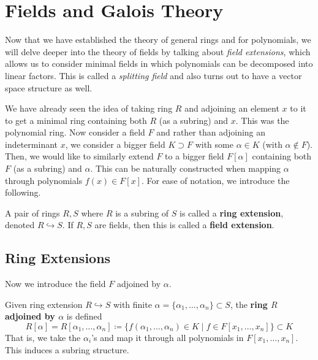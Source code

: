 \section{Fields and Galois Theory} 

  Now that we have established the theory of general rings and for polynomials, we will delve deeper into the theory of fields by talking about \textit{field extensions}, which allows us to consider minimal fields in which polynomials can be decomposed into linear factors. This is called a \textit{splitting field} and also turns out to have a vector space structure as well. 

  We have already seen the idea of taking ring $R$ and adjoining an element $x$ to it to get a minimal ring containing both $R$ (as a subring) and $x$. This was the polynomial ring. Now consider a field $F$ and rather than adjoining an indeterminant $x$, we consider a bigger field $K \supset F$ with some $\alpha \in K$ (with $\alpha \not\in F$). Then, we would like to similarly extend $F$ to a bigger field $F[\alpha]$ containing both $F$ (as a subring) and $\alpha$. This can be naturally constructed when mapping $\alpha$ through polynomials $f(x) \in F[x]$. For ease of notation, we introduce the following. 

  \begin{definition}
    A pair of rings $R, S$ where $R$ is a subring of $S$ is called a \textbf{ring extension}, denoted $R \hookrightarrow S$. If $R, S$ are fields, then this is called a \textbf{field extension}. 
  \end{definition}

\subsection{Ring Extensions} 

  Now we introduce the field $F$ adjoined by $\alpha$. 
  
  \begin{definition} 
    Given ring extension $R \hookrightarrow S$ with finite $\alpha = \{\alpha_1, \ldots, \alpha_n\} \subset S$, the \textbf{ring $R$ adjoined by $\alpha$} is defined 
    \begin{equation}
      R[\alpha] = R[\alpha_1, \ldots, \alpha_n] \coloneqq \{ f(\alpha_1, \ldots, \alpha_n) \in K \mid f \in F[x_1, \ldots, x_n]\} \subset K
    \end{equation} 
    That is, we take the $\alpha_i$'s and map it through all polynomials in $F[x_1, \ldots, x_n]$. This induces a subring structure. 
  \end{definition} 

